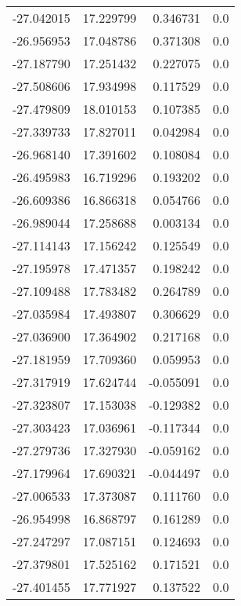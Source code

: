 \begin{tabular}{rrrr}
      -27.042015 &        17.229799 &    0.346731 &   0.0 \\
      -26.956953 &        17.048786 &    0.371308 &   0.0 \\
      -27.187790 &        17.251432 &    0.227075 &   0.0 \\
      -27.508606 &        17.934998 &    0.117529 &   0.0 \\
      -27.479809 &        18.010153 &    0.107385 &   0.0 \\
      -27.339733 &        17.827011 &    0.042984 &   0.0 \\
      -26.968140 &        17.391602 &    0.108084 &   0.0 \\
      -26.495983 &        16.719296 &    0.193202 &   0.0 \\
      -26.609386 &        16.866318 &    0.054766 &   0.0 \\
      -26.989044 &        17.258688 &    0.003134 &   0.0 \\
      -27.114143 &        17.156242 &    0.125549 &   0.0 \\
      -27.195978 &        17.471357 &    0.198242 &   0.0 \\
      -27.109488 &        17.783482 &    0.264789 &   0.0 \\
      -27.035984 &        17.493807 &    0.306629 &   0.0 \\
      -27.036900 &        17.364902 &    0.217168 &   0.0 \\
      -27.181959 &        17.709360 &    0.059953 &   0.0 \\
      -27.317919 &        17.624744 &   -0.055091 &   0.0 \\
      -27.323807 &        17.153038 &   -0.129382 &   0.0 \\
      -27.303423 &        17.036961 &   -0.117344 &   0.0 \\
      -27.279736 &        17.327930 &   -0.059162 &   0.0 \\
      -27.179964 &        17.690321 &   -0.044497 &   0.0 \\
      -27.006533 &        17.373087 &    0.111760 &   0.0 \\
      -26.954998 &        16.868797 &    0.161289 &   0.0 \\
      -27.247297 &        17.087151 &    0.124693 &   0.0 \\
      -27.379801 &        17.525162 &    0.171521 &   0.0 \\
      -27.401455 &        17.771927 &    0.137522 &   0.0 \\

\end{tabular}
